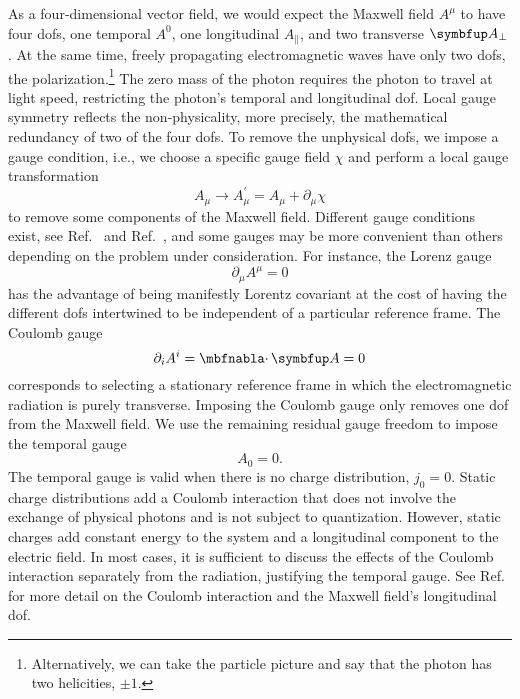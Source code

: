 As a four-dimensional vector field, we would expect the Maxwell field $A^\mu$ to have four \gls{dof}s, one temporal $A^0$, one longitudinal $A_\parallel$, and two transverse $\vb{A}_\perp$.
At the same time, freely propagating electromagnetic waves have only two \gls{dof}s, the polarization.\footnote{Alternatively, we can take the particle picture and say that the photon has two helicities, $\pm1$.}
The zero mass of the photon requires the photon to travel at light speed, restricting the photon's temporal and longitudinal \gls{dof}.
Local gauge symmetry reflects the non-physicality, more precisely, the mathematical redundancy of two of the four \gls{dof}s.
To remove the unphysical \gls{dof}s, we impose a gauge condition, i.e., we choose a specific gauge field $\chi$ and perform a local gauge transformation
\begin{equation}
	A_\mu
	\to
	A_\mu^\prime
	=
	A_\mu
	+
	\partial_\mu\chi
\end{equation}
to remove some components of the Maxwell field.
Different gauge conditions exist, see Ref.~\cite[p.~144]{Greiner2013} and Ref.~\cite[p.~339]{Srednicki2007}, and some gauges may be more convenient than others depending on the problem under consideration.
For instance, the Lorenz gauge
\begin{equation}
	\partial_\mu
	A^\mu
	=
	0	
\end{equation}
has the advantage of being manifestly Lorentz covariant at the cost of having the different \gls{dof}s intertwined to be independent of a particular reference frame.
The Coulomb gauge
\begin{equation}
	\partial_i
	A^i
	=
	\div\vb{A}
	=
	0
	\label{eq:coulomb_gauge}
\end{equation}
corresponds to selecting a stationary reference frame in which the electromagnetic radiation is purely transverse.
Imposing the Coulomb gauge only removes one \gls{dof} from the Maxwell field.
We use the remaining residual gauge freedom to impose the temporal gauge
\begin{equation}
	A_0
	=
	0
	\label{eq:temporal_gauge}
	.
\end{equation}
The temporal gauge is valid when there is no charge distribution, $j_0=0$.
Static charge distributions add a Coulomb interaction that does not involve the exchange of physical photons and is not subject to quantization.
However, static charges add constant energy to the system and a longitudinal component to the electric field.
In most cases, it is sufficient to discuss the effects of the Coulomb interaction separately from the radiation, justifying the temporal gauge.
See Ref.~\cite[p.~145,187,200]{Greiner2013} for more detail on the Coulomb interaction and the Maxwell field's longitudinal \gls{dof}.

